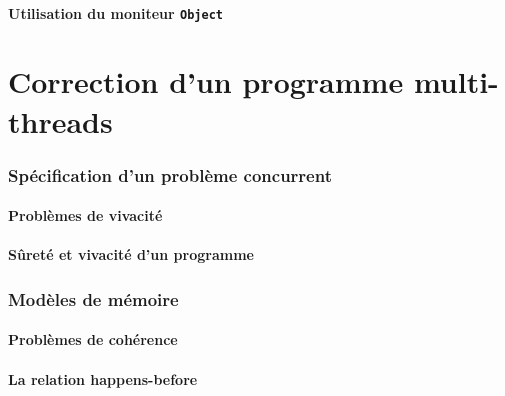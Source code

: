 \documentclass[9pt]{beamer}
\begin{document}
\subsection{Utilisation du moniteur \lstinline{Object}}



 
 
\part{Correction d'un programme multi-threads}
 
\section{Spécification d'un problème concurrent}
 
\subsection{Problèmes de vivacité}





 
\subsection{Sûreté et vivacité d'un programme}




 
\section{Modèles de mémoire}
  
\subsection{Problèmes de cohérence}





 
\subsection{La relation happens-before}




 
\end{document}
